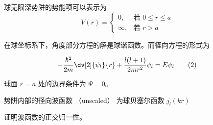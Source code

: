 
\begin{issues}
\issueDraft
\end{issues}


球无限深势阱的势能项可以表示为
$$
V(r)=
\begin{cases}
0,  & \text{若 $0\leq r\leq a$} \\
\infty, & \text{若 $r>a$}
\end{cases}\tag{1}
$$

在球坐标系下，角度部分方程的解是球谐函数。而径向方程的形式为

\begin{equation}
-\frac{\hbar^2}{2m} \dv[2]{\psi_l}{r} + \frac{l(l + 1)}{2mr^2}\psi_l = E\psi_l\tag{2}
\end{equation}

球面 $r = a$ 处的边界条件为 $\Psi = 0$。

势阱内部的径向波函数 （unscaled） 为球贝塞尔函数 $j_l(kr)$

证明波函数的正交归一性。
